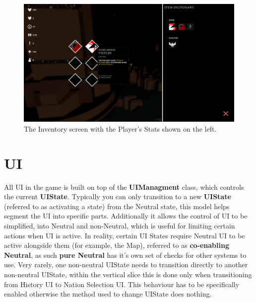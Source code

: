 \documentclass{report}
\begin{document}
\begin{figure}[H]
	\centering
    \includegraphics[width=.9\textwidth]{inventoryScreen.png}
    \caption{The Inventory screen with the Player's Stats shown on the left.}
\end{figure}

\section{UI}

All UI in the game is built on top of the \textbf{UIManagment} class, which controls the current \textbf{UIState}. Typically you can only transition to a new \textbf{UIState} (referred to as activating a state) from the Neutral state, this model helps segment the UI into specific parts. Additionally it allows the control of UI to be simplified, into Neutral and non-Neutral, which is useful for limiting certain actions when UI is active. In reality, certain UI States require Neutral UI to be active alongside them (for example, the Map), referred to as \textbf{co-enabling Neutral}, as such \textbf{pure Neutral} has it's own set of checks for other systems to use. Very rarely, one non-neutral UIState needs to transition directly to another non-neutral UIState, within the vertical slice this is done only when transitioning from History UI to Nation Selection UI. This behaviour has to be specifically enabled otherwise the method used to change UIState does nothing.
\end{document}
